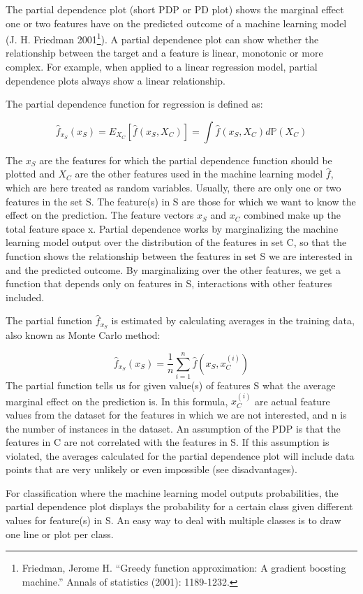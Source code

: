 \documentclass[
  12pt,
]{krantz}
\begin{document}
The partial dependence plot (short PDP or PD plot) shows the marginal effect one or two features have on the predicted outcome of a machine learning model (J. H. Friedman 2001\footnote{Friedman, Jerome H. ``Greedy function approximation: A gradient boosting machine.'' Annals of statistics (2001): 1189-1232.}).
A partial dependence plot can show whether the relationship between the target and a feature is linear, monotonic or more complex.
For example, when applied to a linear regression model, partial dependence plots always show a linear relationship.

The partial dependence function for regression is defined as:

\[\hat{f}_{x_S}(x_S)=E_{X_C}\left[\hat{f}(x_S,X_C)\right]=\int\hat{f}(x_S,X_C)d\mathbb{P}(X_C)\]

The \(x_S\) are the features for which the partial dependence function should be plotted and \(X_C\) are the other features used in the machine learning model \(\hat{f}\), which are here treated as random variables.
Usually, there are only one or two features in the set S.
The feature(s) in S are those for which we want to know the effect on the prediction.
The feature vectors \(x_S\) and \(x_C\) combined make up the total feature space x.
Partial dependence works by marginalizing the machine learning model output over the distribution of the features in set C, so that the function shows the relationship between the features in set S we are interested in and the predicted outcome.
By marginalizing over the other features, we get a function that depends only on features in S, interactions with other features included.

The partial function \(\hat{f}_{x_S}\) is estimated by calculating averages in the training data, also known as Monte Carlo method:

\[\hat{f}_{x_S}(x_S)=\frac{1}{n}\sum_{i=1}^n\hat{f}(x_S,x^{(i)}_{C})\]
The partial function tells us for given value(s) of features S what the average marginal effect on the prediction is.
In this formula, \(x^{(i)}_{C}\) are actual feature values from the dataset for the features in which we are not interested, and n is the number of instances in the dataset.
An assumption of the PDP is that the features in C are not correlated with the features in S.
If this assumption is violated, the averages calculated for the partial dependence plot will include data points that are very unlikely or even impossible (see disadvantages).

For classification where the machine learning model outputs probabilities, the partial dependence plot displays the probability for a certain class given different values for feature(s) in S.
An easy way to deal with multiple classes is to draw one line or plot per class.
\end{document}

